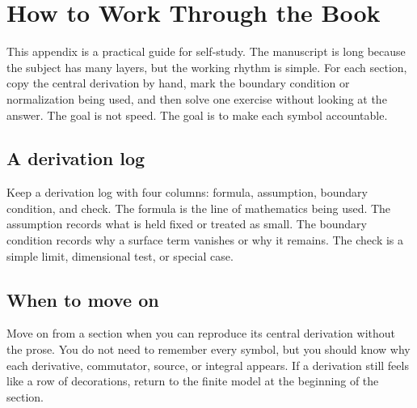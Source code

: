 \chapter{How to Work Through the Book}

This appendix is a practical guide for self-study.  The manuscript is long because the subject has many layers, but the working rhythm is simple.  For each section, copy the central derivation by hand, mark the boundary condition or normalization being used, and then solve one exercise without looking at the answer.  The goal is not speed.  The goal is to make each symbol accountable.

\section{A derivation log}

Keep a derivation log with four columns: formula, assumption, boundary condition, and check.  The formula is the line of mathematics being used.  The assumption records what is held fixed or treated as small.  The boundary condition records why a surface term vanishes or why it remains.  The check is a simple limit, dimensional test, or special case.

\section{When to move on}

Move on from a section when you can reproduce its central derivation without the prose.  You do not need to remember every symbol, but you should know why each derivative, commutator, source, or integral appears.  If a derivation still feels like a row of decorations, return to the finite model at the beginning of the section.
